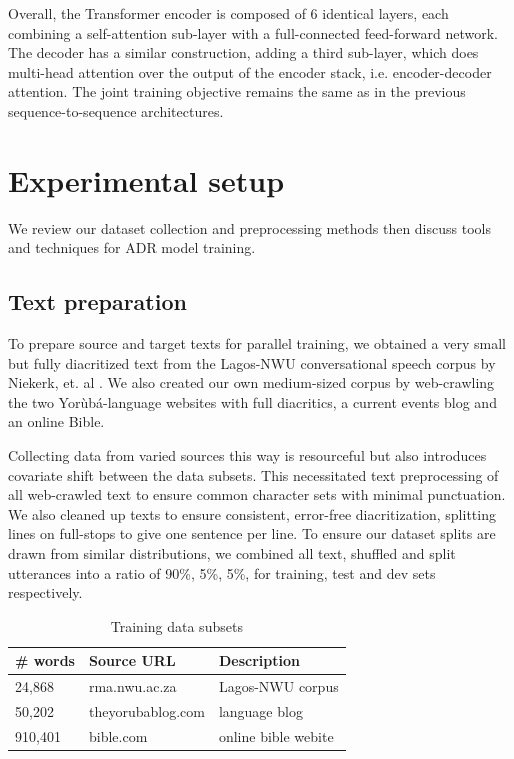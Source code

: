 \documentclass[a4paper]{article}
\begin{document}
Overall, the Transformer encoder is composed of 6 identical layers, each combining a self-attention sub-layer with a full-connected feed-forward network. The decoder has a similar construction, adding a third sub-layer, which does multi-head attention over the output of the encoder stack, i.e. encoder-decoder attention. The joint training objective remains the same as in the previous sequence-to-sequence architectures.

\section{Experimental setup}

We review our dataset collection and preprocessing methods then discuss tools and techniques for ADR model training.

\subsection{Text preparation}

To prepare source and target texts for parallel training, we obtained a very small but fully diacritized text from the Lagos-NWU conversational speech corpus by Niekerk, et. al \cite{niekerk2012tone}. We also created our own medium-sized corpus by web-crawling the two Yor{\`u}b{\'a}-language websites with full diacritics, a current events blog and an online Bible. 

 Collecting data from varied sources this way is resourceful but also introduces covariate shift between the data subsets. This necessitated text preprocessing of all web-crawled text to ensure common character sets with minimal punctuation. We also cleaned up texts to ensure consistent, error-free diacritization, splitting lines on full-stops to give one sentence per line. To ensure our dataset splits are drawn from similar distributions, we combined all text, shuffled and split utterances into a ratio of 90\%, 5\%, 5\%, for training, test and dev sets respectively.
  \begin{table}[h]
  \caption{Training data subsets}
  \label{tab:training_datasets}
  \centering
  \begin{tabular}{lll}
    \toprule
    \textbf{\# words} & \textbf{Source URL}  & \textbf{Description} \\
    \midrule
    24,868 & rma.nwu.ac.za  & Lagos-NWU corpus \\  
    50,202 & theyorubablog.com & language blog\\  
    910,401 & bible.com & online bible webite \\
    \bottomrule
  \end{tabular}
\end{table}
\end{document}
